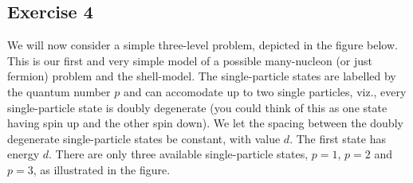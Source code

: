 \documentclass[prc]{revtex4}
\begin{document}
\subsection*{Exercise 4}
We will now consider a simple three-level problem, depicted in the figure below. This is our first and very simple model of a possible many-nucleon (or just fermion) problem and the shell-model.
The single-particle states are labelled by the quantum number $p$ and can accomodate up to two single particles, 
viz., every single-particle state 
is doubly degenerate (you could think of this as one state having spin up and the other spin down). 
We let the spacing between the doubly degenerate single-particle states be constant, with value $d$.  The first state
has energy $d$. There are only three available single-particle states, $p=1$, $p=2$ and $p=3$, as illustrated
in the figure. 
\end{document}
